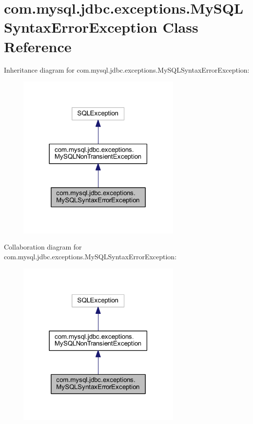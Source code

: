 \hypertarget{classcom_1_1mysql_1_1jdbc_1_1exceptions_1_1_my_s_q_l_syntax_error_exception}{}\section{com.\+mysql.\+jdbc.\+exceptions.\+My\+S\+Q\+L\+Syntax\+Error\+Exception Class Reference}
\label{classcom_1_1mysql_1_1jdbc_1_1exceptions_1_1_my_s_q_l_syntax_error_exception}


Inheritance diagram for com.\+mysql.\+jdbc.\+exceptions.\+My\+S\+Q\+L\+Syntax\+Error\+Exception\+:
\nopagebreak
\begin{figure}[H]
\begin{center}
\leavevmode
\includegraphics[width=230pt]{classcom_1_1mysql_1_1jdbc_1_1exceptions_1_1_my_s_q_l_syntax_error_exception__inherit__graph}
\end{center}
\end{figure}


Collaboration diagram for com.\+mysql.\+jdbc.\+exceptions.\+My\+S\+Q\+L\+Syntax\+Error\+Exception\+:
\nopagebreak
\begin{figure}[H]
\begin{center}
\leavevmode
\includegraphics[width=230pt]{classcom_1_1mysql_1_1jdbc_1_1exceptions_1_1_my_s_q_l_syntax_error_exception__coll__graph}
\end{center}
\end{figure}
